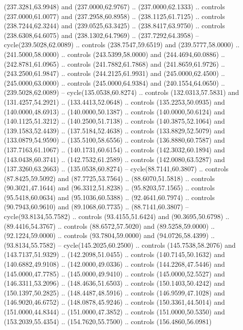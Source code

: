   (237.3281,63.9948) and (237.0000,62.9767) .. (237.0000,62.1333) .. controls
  (237.0000,61.0077) and (237.2958,60.8958) .. (238.1125,61.7125) .. controls
  (238.7244,62.3244) and (239.0525,63.3425) .. (238.8417,63.9750) .. controls
  (238.6308,64.6075) and (238.1302,64.7969) .. (237.7292,64.3958) --
  cycle(239.5028,62.0089) .. controls (238.7547,59.6519) and (239.5777,58.0000)
  .. (241.5000,58.0000) .. controls (243.5399,58.0000) and (244.4694,60.0886) ..
  (242.8781,61.0965) .. controls (241.7882,61.7868) and (241.8659,61.9726) ..
  (243.2500,61.9847) .. controls (244.2125,61.9931) and (245.0000,62.4500) ..
  (245.0000,63.0000) .. controls (245.0000,64.9384) and (240.1554,64.0650) ..
  (239.5028,62.0089) -- cycle(135.0538,60.8274) .. controls (132.0313,57.5831)
  and (131.4257,54.2921) .. (133.4413,52.0648) .. controls (135.2253,50.0935)
  and (140.0000,48.6913) .. (140.0000,50.1387) .. controls (140.0000,50.6124)
  and (140.1125,51.3212) .. (140.2500,51.7138) .. controls (140.3875,52.1064)
  and (139.1583,52.4439) .. (137.5184,52.4638) .. controls (133.8829,52.5079)
  and (133.0879,54.9590) .. (135.5100,58.6556) .. controls (136.8880,60.7587)
  and (137.7163,61.1067) .. (140.1731,60.6154) .. controls (142.3032,60.1894)
  and (143.0438,60.3741) .. (142.7532,61.2589) .. controls (142.0080,63.5287)
  and (137.3260,63.2663) .. (135.0538,60.8274) -- cycle(88.7141,60.3807) ..
  controls (87.8425,59.5092) and (87.7725,53.7564) .. (88.6070,51.5818) ..
  controls (90.3021,47.1644) and (96.3312,51.8238) .. (95.8203,57.1565) ..
  controls (95.5418,60.0634) and (95.1036,60.5388) .. (92.4641,60.7974) ..
  controls (90.7943,60.9610) and (89.1068,60.7735) .. (88.7141,60.3807) --
  cycle(93.8134,55.7582) .. controls (93.4155,51.6424) and (90.3695,50.6798) ..
  (89.4416,54.3767) .. controls (88.6572,57.5020) and (89.5258,59.0000) ..
  (92.1224,59.0000) .. controls (93.7804,59.0000) and (94.0726,58.4399) ..
  (93.8134,55.7582) -- cycle(145.2025,60.2500) .. controls (145.7538,58.2076)
  and (143.7137,51.9329) .. (142.2098,51.0455) .. controls (140.7145,50.1632)
  and (140.6882,49.9108) .. (142.0000,49.0336) .. controls (144.2268,47.5446)
  and (145.0000,47.7785) .. (145.0000,49.9410) .. controls (145.0000,52.5527)
  and (146.3311,53.2096) .. (148.4636,51.6503) .. controls (150.1403,50.4242)
  and (150.1397,50.2825) .. (148.4487,48.5916) .. controls (146.9599,47.1028)
  and (146.9020,46.6752) .. (148.0878,45.9246) .. controls (150.3361,44.5014)
  and (151.0000,44.8344) .. (151.0000,47.3852) .. controls (151.0000,50.5350)
  and (153.2039,55.4354) .. (154.7620,55.7500) .. controls (156.4860,56.0981)
